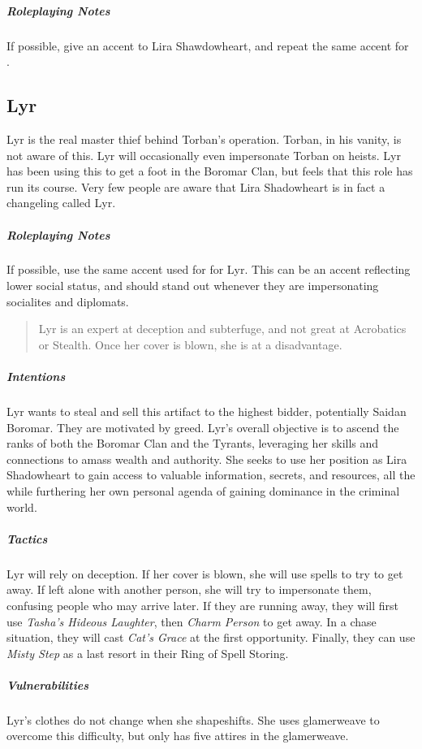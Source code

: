 \documentclass[twocolumn]{dndbook}
\newenvironment{emphasisParagraph}{
	\begin{quote}
	\begin{mdframed}[
		topline=false,
		bottomline=false,
		rightline=false,
		skipabove=\topsep,
		skipbelow=\topsep,
		linecolor=xkcdBottleGreen,
		linewidth=3pt,
	]
	\em
}{
	\end{mdframed}
	\end{quote}
}
\begin{document}
\subparagraph*{Roleplaying Notes}
If possible, give an accent to Lira Shawdowheart, and repeat the same accent for .

\subsection{Lyr}
\label{subsec:lyr}

Lyr is the real master thief behind Torban's operation.
Torban, in his vanity, is not aware of this.
Lyr will occasionally even impersonate Torban on heists.
Lyr has been using this to get a foot in the Boromar Clan, but feels that this role has run its course.
Very few people are aware that Lira Shadowheart is in fact a changeling called Lyr.

\subparagraph*{Roleplaying Notes}
If possible, use the same accent used for  for Lyr.
This can be an accent reflecting lower social status, and should stand out whenever they are impersonating socialites and diplomats.\par

\begin{emphasisParagraph}
	Lyr is an expert at deception and subterfuge, and not great at Acrobatics or Stealth.
	Once her cover is blown, she is at a disadvantage.
\end{emphasisParagraph}

\subparagraph*{Intentions}
Lyr wants to steal and sell this artifact to the highest bidder, potentially Saidan Boromar.
They are motivated by greed.
Lyr's overall objective is to ascend the ranks of both the Boromar Clan and the Tyrants, leveraging her skills and connections to amass wealth and authority.
She seeks to use her position as Lira Shadowheart to gain access to valuable information, secrets, and resources, all the while furthering her own personal agenda of gaining dominance in the criminal world.

\subparagraph*{Tactics}
Lyr will rely on deception.
If her cover is blown, she will use spells to try to get away.
If left alone with another person, she will try to impersonate them, confusing people who may arrive later.
If they are running away, they will first use \emph{Tasha's Hideous Laughter}, then \emph{Charm Person} to get away.
In a chase situation, they will cast \emph{Cat's Grace} at the first opportunity.
Finally, they can use \emph{Misty Step} as a last resort in their Ring of Spell Storing.

\subparagraph*{Vulnerabilities}
Lyr's clothes do not change when she shapeshifts.
She uses glamerweave to overcome this difficulty, but only has five attires in the glamerweave.
\end{document}
